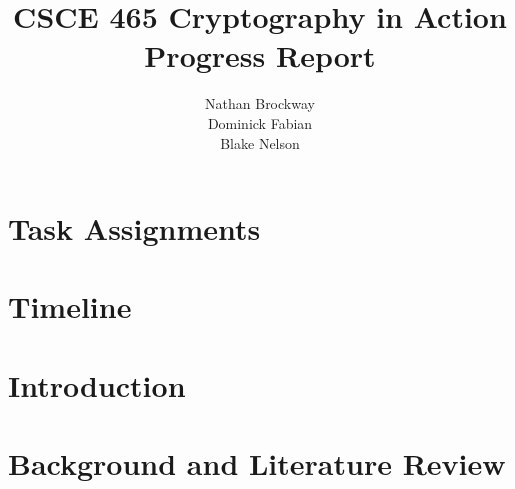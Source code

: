\documentclass{report}
\title{CSCE 465 Cryptography in Action Progress Report}
\author{Nathan Brockway\\Dominick Fabian\\Blake Nelson}
\begin{document}
\maketitle

\begin{abstract}
    \blindtext
    \blindtext
\end{abstract}

\section{Task Assignments}

\section{Timeline}

\section{Introduction}

\section{Background and Literature Review}

\iffalse 
\newpage

\begin{thebibliography}{9}

    \bibitem{ieee}
    IEEE-CS/ACM Joint Task Force on Software Engineering Ethics and Professional Practices\\
    \texttt{https://www.computer.org/web/education/code-of-ethics}

\end{thebibliography}
\fi
\end{document}
